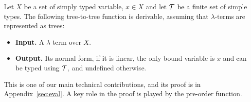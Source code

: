 



\begin{theorem}\label{thm:normalise} Let $X$ be a set of simply typed variable, $x\in X$ and let $\mathcal T$ be a finite set of simple types.
    The following tree-to-tree function is derivable, assuming that $\lambda$-terms are represented as trees:
    \begin{itemize}
        \item{\bf Input.} A $\lambda$-term over $X$.
        \item {\bf Output.} Its normal form, if it is linear, the only bound variable is  $x$ and  can be typed using ${\mathcal T}$, and undefined otherwise.
    \end{itemize}
\end{theorem}

This is one of our main technical contributions, and its proof is in Appendix~\ref{sec:eval}. A key role in the proof is played by the pre-order function. 




